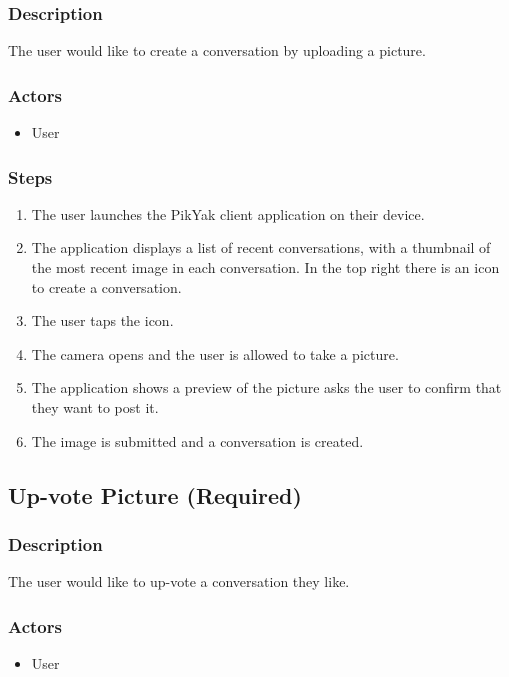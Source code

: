 \documentclass[11pt]{scrartcl}
\begin{document}
        \subsubsection{Description}
            The user would like to create a conversation by uploading a picture.
        \subsubsection{Actors}
            \begin{itemize}
                \item User
            \end{itemize}
        \subsubsection{Steps}
            \begin{enumerate}
                \item The user launches the PikYak client application on their device.
                \item The application displays a list of recent conversations, with a thumbnail of the most recent image in each conversation. In the top right there is an icon to create a conversation.
                \item The user taps the icon.
                \item The camera opens and the user is allowed to take a picture.
                \item The application shows a preview of the picture asks the user to confirm that they want to post it.
                \item The image is submitted and a conversation is created.
            \end{enumerate}
    
    \subsection{Up-vote Picture (Required)}
        \subsubsection{Description}
            The user would like to up-vote a conversation they like.
        \subsubsection{Actors}
            \begin{itemize}
                \item User
            \end{itemize}
\end{document}
